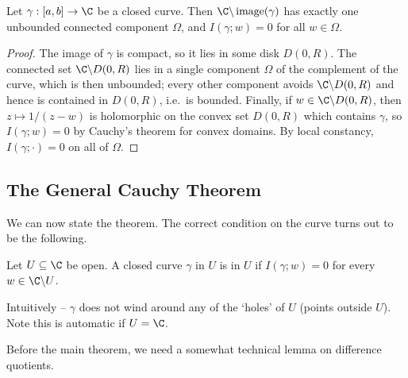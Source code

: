 \begin{proposition}
    Let $\gamma: [a, b] \rightarrow \C$ be a closed curve. Then $\C \backslash \operatorname{image}(\gamma)$ has exactly one unbounded connected component $\Omega$, and $I(\gamma; w) = 0$ for all $w \in \Omega$.
\end{proposition}
\begin{proof}
    The image of $\gamma$ is compact, so it lies in some disk $D(0, R)$. The connected set $\C \backslash D(0, R)$ lies in a single component $\Omega$ of the complement of the curve, which is then unbounded; every other component avoids $\C \backslash D(0, R)$ and hence is contained in $D(0, R)$, i.e.\ is bounded. Finally, if $w \in \C \backslash D(0, R)$, then $z \mapsto 1/(z - w)$ is holomorphic on the convex set $D(0, R)$ which contains $\gamma$, so $I(\gamma; w) = 0$ by Cauchy's theorem for convex domains. By local constancy, $I(\gamma; \cdot) = 0$ on all of $\Omega$.
\end{proof}

\subsection{The General Cauchy Theorem}

We can now state the theorem. The correct condition on the curve turns out to be the following.

\begin{definition}
    Let $U \subseteq \C$ be open. A closed curve $\gamma$ in $U$ is  in $U$ if $I(\gamma; w) = 0$ for every $w \in \C \backslash U$.
\end{definition}

Intuitively -- $\gamma$ does not wind around any of the `holes' of $U$ (points outside $U$). Note this is automatic if $U = \C$.

Before the main theorem, we need a somewhat technical lemma on difference quotients.


